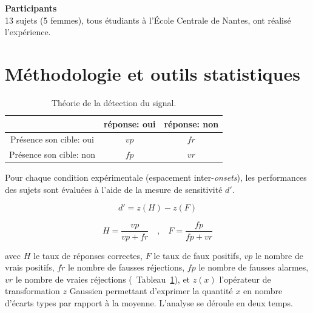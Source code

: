 {\setlength{\parindent}{0cm}\textbf{Participants}} \\

13 sujets (5 femmes), tous étudiants à l'École Centrale de Nantes, ont réalisé l'expérience.
 
\section{Méthodologie et outils statistiques}
\label{app:xptextureMethodo}

\begin{table}[t]
\centering
\begin{tabular}{c| c c}  
                         & réponse: oui & réponse: non  \\      
\hline
Présence son cible: oui  & $vp$           & $fr$ \\
Présence son cible: non  & $fp$           & $vr$ \\
\hline
\end{tabular}
\vspace{0.5mm}
\caption[Théorie de la détection du signal.]{Théorie de la détection du signal.}
\label{tab:sdtHitFP}
\end{table}

Pour chaque condition expérimentale (espacement inter-\emph{onsets}), les performances des sujets sont évaluées à l'aide de la mesure de sensitivité $d'$.

\begin{equation}
d'=z(H)-z(F)
\end{equation}

\begin{equation}
H=\dfrac{vp}{vp+fr} \quad \textrm{,} \quad F=\dfrac{fp}{fp+vr}
\end{equation}

avec $H$ le taux de réponses correctes, $F$ le taux de faux positifs, $vp$ le nombre de vrais positifs, $fr$ le nombre de fausses réjections, $fp$ le nombre de fausses alarmes, $vr$ le nombre de vraies réjections (\cf~Tableau~\ref{tab:sdtHitFP}), et $z(x)$ l'opérateur de transformation $z$ Gaussien permettant d'exprimer la quantité $x$ en nombre d'écarts types par rapport à la moyenne.
L'analyse se déroule en deux temps.

